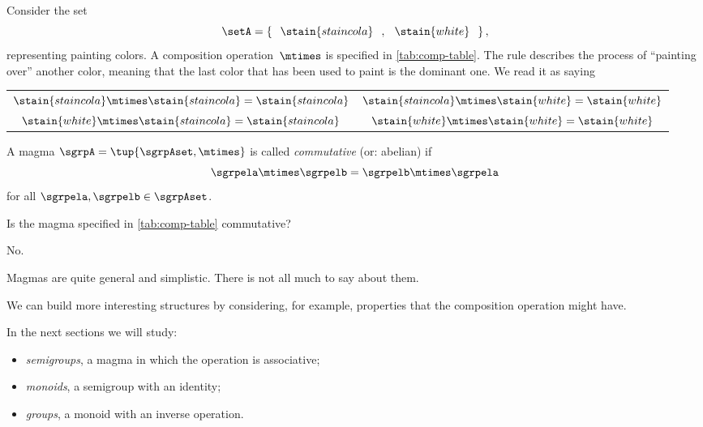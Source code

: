 \begin{example}
Consider the set
\begin{equation*}
    \setA = \left\{\hspace{0.25cm} \stain{staincola}\hspace{0.25cm},\hspace{0.25cm} \stain{white}\hspace{0.25cm}\right\},
\end{equation*}
representing painting colors.
A composition operation~$\mtimes$ is specified in \cref{tab:comp-table}.
The rule describes the process of ``painting over'' another color, meaning that the last color that has been used to paint is the dominant one.
We read it as saying
\begin{center}
    \setlength{\tabcolsep}{20pt}
    \begin{tabular}{cc}
        $\stain{staincola} \mtimes \stain{staincola} = \stain{staincola}$ & $\stain{staincola} \mtimes \stain{white} = \stain{white}$ \\
        $\stain{white} \mtimes \stain{staincola}     = \stain{staincola}$ & $\stain{white} \mtimes \stain{white} = \stain{white}$
    \end{tabular}
\end{center}
\end{example}

\begin{definition}
A magma $\sgrpA = \tup{\sgrpAset, \mtimes}$ is called \emph{commutative} (or: abelian) if
     \begin{equation}
                      \label{eq:semigroup-commutativity}
                      \sgrpela \mtimes   \sgrpelb = \sgrpelb \mtimes \sgrpela 
     \end{equation}
for all $\sgrpela , \sgrpelb \in \sgrpAset$.
\end{definition}

\begin{exercise}
Is the magma specified in \cref{tab:comp-table} commutative?
\end{exercise}
\begin{solution}
No. 
\end{solution}

Magmas are quite general and simplistic.
There is not all much to say about them.

We can build more interesting structures by considering, for example, properties that the composition operation might have.

In the next sections we will study:

\begin{itemize}
    \item \emph{semigroups}, a magma in which the operation is associative;
    \item \emph{monoids}, a semigroup with an identity;
    \item \emph{groups}, a monoid with an inverse operation.
\end{itemize}